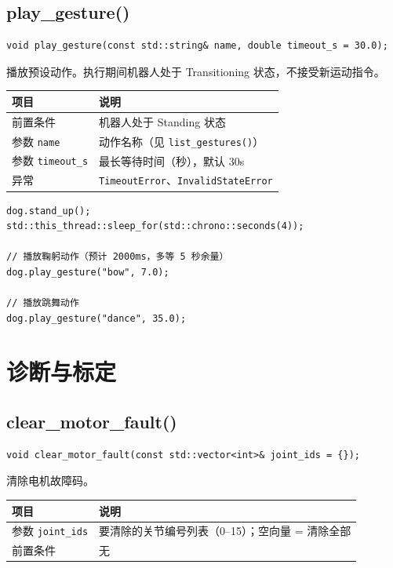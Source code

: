 \documentclass[a4paper,11pt,openany]{book}
\begin{document}
\subsection{play\_gesture()}

\begin{lstlisting}[style=cpp,numbers=none]
void play_gesture(const std::string& name, double timeout_s = 30.0);
\end{lstlisting}

播放预设动作。执行期间机器人处于 Transitioning 状态，不接受新运动指令。

\begin{longtable}{ll}
\toprule
项目 & 说明 \\
\midrule
\endhead
前置条件 & 机器人处于 Standing 状态 \\
参数 \texttt{name} & 动作名称（见 \texttt{list\_gestures()}）\\
参数 \texttt{timeout\_s} & 最长等待时间（秒），默认 30s \\
异常 & \texttt{TimeoutError}、\texttt{InvalidStateError} \\
\bottomrule
\end{longtable}

\begin{lstlisting}[style=cpp]
dog.stand_up();
std::this_thread::sleep_for(std::chrono::seconds(4));

// 播放鞠躬动作（预计 2000ms，多等 5 秒余量）
dog.play_gesture("bow", 7.0);

// 播放跳舞动作
dog.play_gesture("dance", 35.0);
\end{lstlisting}

\section{诊断与标定}

\subsection{clear\_motor\_fault()}

\begin{lstlisting}[style=cpp,numbers=none]
void clear_motor_fault(const std::vector<int>& joint_ids = {});
\end{lstlisting}

清除电机故障码。

\begin{longtable}{ll}
\toprule
项目 & 说明 \\
\midrule
\endhead
参数 \texttt{joint\_ids} & 要清除的关节编号列表（0--15）；空向量 = 清除全部 \\
前置条件 & 无 \\
\bottomrule
\end{longtable}
\end{document}
